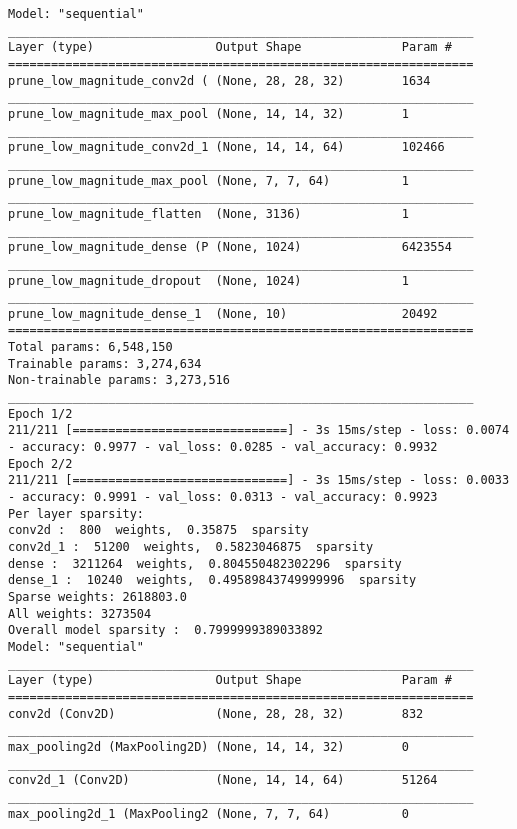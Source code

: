 \begin{lstlisting}[label={lst:mnistpipelineoutput},
    caption=MNIST pipeline output execution]
Model: "sequential"
_________________________________________________________________
Layer (type)                 Output Shape              Param #
=================================================================
prune_low_magnitude_conv2d ( (None, 28, 28, 32)        1634
_________________________________________________________________
prune_low_magnitude_max_pool (None, 14, 14, 32)        1
_________________________________________________________________
prune_low_magnitude_conv2d_1 (None, 14, 14, 64)        102466
_________________________________________________________________
prune_low_magnitude_max_pool (None, 7, 7, 64)          1
_________________________________________________________________
prune_low_magnitude_flatten  (None, 3136)              1
_________________________________________________________________
prune_low_magnitude_dense (P (None, 1024)              6423554
_________________________________________________________________
prune_low_magnitude_dropout  (None, 1024)              1
_________________________________________________________________
prune_low_magnitude_dense_1  (None, 10)                20492
=================================================================
Total params: 6,548,150
Trainable params: 3,274,634
Non-trainable params: 3,273,516
_________________________________________________________________
Epoch 1/2
211/211 [==============================] - 3s 15ms/step - loss: 0.0074 - accuracy: 0.9977 - val_loss: 0.0285 - val_accuracy: 0.9932
Epoch 2/2
211/211 [==============================] - 3s 15ms/step - loss: 0.0033 - accuracy: 0.9991 - val_loss: 0.0313 - val_accuracy: 0.9923
Per layer sparsity:
conv2d :  800  weights,  0.35875  sparsity
conv2d_1 :  51200  weights,  0.5823046875  sparsity
dense :  3211264  weights,  0.804550482302296  sparsity
dense_1 :  10240  weights,  0.49589843749999996  sparsity
Sparse weights: 2618803.0
All weights: 3273504
Overall model sparsity :  0.7999999389033892
Model: "sequential"
_________________________________________________________________
Layer (type)                 Output Shape              Param #
=================================================================
conv2d (Conv2D)              (None, 28, 28, 32)        832
_________________________________________________________________
max_pooling2d (MaxPooling2D) (None, 14, 14, 32)        0
_________________________________________________________________
conv2d_1 (Conv2D)            (None, 14, 14, 64)        51264
_________________________________________________________________
max_pooling2d_1 (MaxPooling2 (None, 7, 7, 64)          0

\end{lstlisting}
